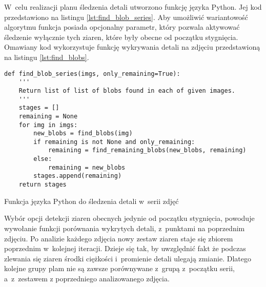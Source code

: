 W~celu realizacji planu śledzenia detali utworzono funkcję języka Python.
Jej kod przedstawiono na listingu \ref{lst:find_blob_series}.
Aby umożliwić wariantowość algorytmu funkcja posiada opcjonalny parametr,
który pozwala aktywować śledzenie wyłącznie tych ziaren, które były obecne od
początku stygnięcia.
Omawiany kod wykorzystuje funkcję wykrywania detali na zdjęciu przedstawioną
na listingu \ref{lst:find_blobs}.
\begin{listing}[htb]
\begin{verbatim}
def find_blob_series(imgs, only_remaining=True):
    '''
    Return list of list of blobs found in each of given images.
    '''
    stages = []
    remaining = None
    for img in imgs:
        new_blobs = find_blobs(img)
        if remaining is not None and only_remaining:
            remaining = find_remaining_blobs(new_blobs, remaining)
        else:
            remaining = new_blobs
        stages.append(remaining)
    return stages
\end{verbatim}
\caption{Funkcja języka Python do śledzenia detali w~serii zdjęć}
\label{lst:find_blob_series}
\end{listing}
Wybór opcji detekcji ziaren obecnych jedynie od początku stygnięcia,
powoduje wywołanie funkcji porównania wykrytych detali, z~punktami
na poprzednim zdjęciu.
Po analizie każdego zdjęcia nowy zestaw ziaren staje się zbiorem poprzednim
w~kolejnej iteracji.
Dzieje się tak, by uwzględnić fakt że podczas zlewania się ziaren środki
ciężkości i~promienie detali ulegają zmianie.
Dlatego kolejne grupy plam nie są zawsze porównywane z~grupą z~początku
serii, a~z~zestawem z poprzedniego analizowanego zdjęcia.

